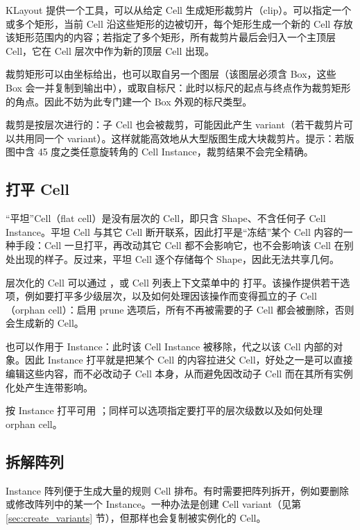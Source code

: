 KLayout 提供一个工具，可以从给定 Cell 生成矩形裁剪片（clip）。可以指定一个或多个矩形，当前 Cell 沿这些矩形的边被切开，每个矩形生成一个新的 Cell 存放该矩形范围内的内容；若指定了多个矩形，所有裁剪片最后会归入一个主顶层 Cell，它在 Cell 层次中作为新的顶层 Cell 出现。

裁剪矩形可以由坐标给出，也可以取自另一个图层（该图层必须含 Box，这些 Box 会一并复制到输出中），或取自标尺：此时以标尺的起点与终点作为裁剪矩形的角点。因此不妨为此专门建一个 Box 外观的标尺类型。

裁剪是按层次进行的：子 Cell 也会被裁剪，可能因此产生 variant（若干裁剪片可以共用同一个 variant）。这样就能高效地从大型版图生成大块裁剪片。提示：若版图中含 45 度之类任意旋转角的 Cell Instance，裁剪结果不会完全精确。

\subsection{打平 Cell}\label{sec:flatten}

“平坦”Cell（flat cell）是没有层次的 Cell，即只含 Shape、不含任何子 Cell Instance。平坦 Cell 与其它 Cell 断开联系，因此打平是“冻结”某个 Cell 内容的一种手段：Cell 一旦打平，再改动其它 Cell 都不会影响它，也不会影响该 Cell 在别处出现的样子。反过来，平坦 Cell 逐个存储每个 Shape，因此无法共享几何。

层次化的 Cell 可以通过 ，或 Cell 列表上下文菜单中的  打平。该操作提供若干选项，例如要打平多少级层次，以及如何处理因该操作而变得孤立的子 Cell（orphan cell）：启用 prune 选项后，所有不再被需要的子 Cell 都会被删除，否则会生成新的 Cell。

 也可以作用于 Instance：此时该 Cell Instance 被移除，代之以该 Cell 内部的对象。因此 Instance 打平就是把某个 Cell 的内容拉进父 Cell，好处之一是可以直接编辑这些内容，而不必改动子 Cell 本身，从而避免因改动子 Cell 而在其所有实例化处产生连带影响。

按 Instance 打平可用 ；同样可以选项指定要打平的层次级数以及如何处理 orphan cell。

\subsection{拆解阵列}\label{sec:resolve_arrays}

Instance 阵列便于生成大量的规则 Cell 排布。有时需要把阵列拆开，例如要删除或修改阵列中的某一个 Instance。一种办法是创建 Cell variant（见第 \ref{sec:create_variants} 节），但那样也会复制被实例化的 Cell。


